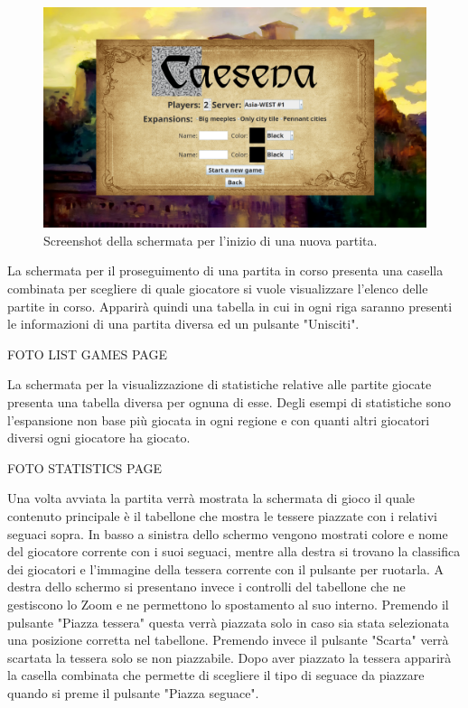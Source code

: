 \begin{figure}[ht]
    \centering\includegraphics[scale=0.25]{images/newGamePage.png}
    \caption{Screenshot della schermata per l'inizio di una nuova partita.}
\end{figure}

La schermata per il proseguimento di una partita in corso presenta una casella combinata per scegliere di quale giocatore si vuole visualizzare l'elenco delle partite in corso. Apparirà quindi una tabella in cui in ogni riga saranno presenti le informazioni di una partita diversa ed un pulsante "Unisciti".

FOTO LIST GAMES PAGE

La schermata per la visualizzazione di statistiche relative alle partite giocate presenta una tabella diversa per ognuna di esse. Degli esempi di statistiche sono l'espansione non base più giocata in ogni regione e con quanti altri giocatori diversi ogni giocatore ha giocato.

FOTO STATISTICS PAGE

Una volta avviata la partita verrà mostrata la schermata di gioco il quale contenuto principale è il tabellone che mostra le tessere piazzate con i relativi seguaci sopra. In basso a sinistra dello schermo vengono mostrati colore e nome del giocatore corrente con i suoi seguaci, mentre alla destra si trovano la classifica dei giocatori e l'immagine della tessera corrente con il pulsante per ruotarla. A destra dello schermo si presentano invece i controlli del tabellone che ne gestiscono lo Zoom e ne permettono lo spostamento al suo interno. Premendo il pulsante "Piazza tessera" questa verrà piazzata solo in caso sia stata selezionata una posizione corretta nel tabellone. Premendo invece il pulsante "Scarta" verrà scartata la tessera solo se non piazzabile. Dopo aver piazzato la tessera apparirà la casella combinata che permette di scegliere il tipo di seguace da piazzare quando si preme il pulsante "Piazza seguace".

